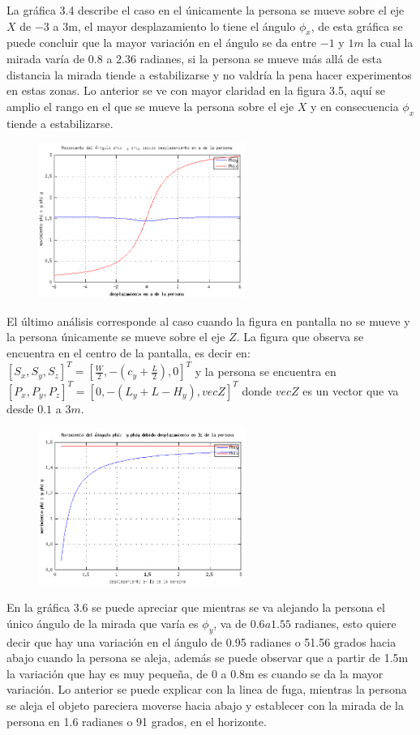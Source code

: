 La gráfica 3.4 describe el caso en el únicamente la  persona se mueve sobre el eje $X$ de $-3$ a $3$m, el mayor desplazamiento lo tiene el ángulo $\phi_x$, de esta gráfica se puede concluir que la mayor variación en el ángulo se da entre $-1$ y $1m$ la cual la mirada varía de $0.8$ a $2.36$ radianes, si la persona se mueve más allá de esta distancia la mirada tiende a estabilizarse y no valdría la pena hacer experimentos en estas zonas. Lo anterior se ve con mayor claridad en la figura 3.5, aquí se amplio el rango en el que se mueve la persona sobre el eje $X$ y en consecuencia $\phi_x$ tiende a estabilizarse.
\begin{figure}[htbp]
	\centering
	\includegraphics[width=0.6\textwidth]{./pictures/figure5}
	\caption{}\label{fig: figura}
\end{figure}

El último análisis corresponde al caso cuando la figura en pantalla no se mueve y la persona únicamente se mueve sobre el eje $Z$. La figura que observa se encuentra en el centro de la pantalla, es decir en: $[S_x, S_y, S_z]^T=[\frac{W}{2}, -(c_y+\frac{L}{2}), 0]^T$ y la persona se encuentra en $[P_x, P_y, P_z]^T=[0, -(L_y+L-H_y), vecZ]^T$ donde $vecZ$ es un vector que va desde $0.1$ a $3m$.
\begin{figure}[htbp]
	\centering
	\includegraphics[width=0.6\textwidth]{./pictures/figure4}
	\caption{}\label{fig: figura}
\end{figure}
En la gráfica 3.6 se puede apreciar que mientras se va alejando la persona el único ángulo de la mirada que varía es $\phi_y$, va de $0.6 a 1.55$ radianes, esto quiere decir que hay una variación en el ángulo de 0.95 radianes o 51.56 grados hacia abajo cuando la persona se aleja, además se puede observar que a partir de 1.5m la variación que hay es muy pequeña, de 0 a 0.8m es cuando se da la mayor variación. Lo anterior se puede explicar  con la linea de fuga, mientras la persona se aleja el objeto pareciera moverse hacia abajo y establecer con la mirada de la persona en 1.6 radianes o 91 grados, en el horizonte.

